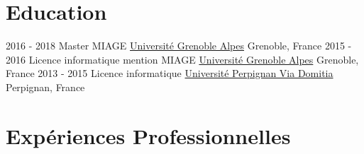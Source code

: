 \documentclass[letterpaper]{twentysecondcv} %
\begin{document}
\makeprofile %

\section{Education}

\begin{twenty} %
	\twentyitem
    	{2016 - 2018}
        {Master MIAGE}
        {\href{https://www.univ-grenoble-alpes.fr//}{Université Grenoble Alpes}}
        {}
        {Grenoble, France}
	\twentyitem
    	{2015 - 2016}
        {Licence informatique mention MIAGE}
        {\href{https://www.univ-grenoble-alpes.fr//}{Université Grenoble Alpes}}
        {}
        {Grenoble, France}
    \twentyitem
    	{2013 - 2015}
        {Licence informatique}
        {\mbox{}\hfill\href{https://www.univ-perp.fr/}{Université Perpignan Via Domitia}}
        {}
        {Perpignan, France}
\end{twenty}


\section{Expériences Professionnelles}
\end{document}
